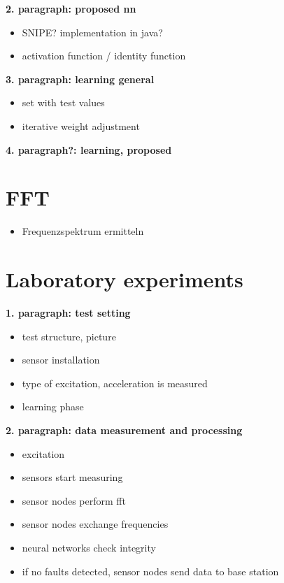 \documentclass[12pt]{scrartcl}
\begin{document}
\textbf{2. paragraph: proposed nn}

\begin{itemize}
\item SNIPE? implementation in java?
\item activation function / identity function
\end{itemize}

\textbf{3. paragraph: learning general}

\begin{itemize}
\item set with test values
\item iterative weight adjustment
\end{itemize}

\textbf{4. paragraph?: learning, proposed}


\section*{FFT}

\begin{itemize}
\item Frequenzspektrum ermitteln
\end{itemize}


\newpage
\section*{Laboratory experiments}

\textbf{1. paragraph: test setting}

\begin{itemize}
\item test structure, picture
\item sensor installation
\item type of excitation, acceleration is measured

\item learning phase
\end{itemize}

\textbf{2. paragraph: data measurement and processing}

\begin{itemize}
\item excitation
\item sensors start measuring
\item sensor nodes perform fft
\item sensor nodes exchange frequencies
\item neural networks check integrity
\item if no faults detected, sensor nodes send data to base station
\end{itemize}
\end{document}
